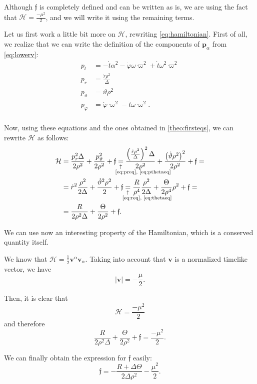 Although $\mathfrak{f}$ is completely defined and can be written as is, we are using the fact that $\mathcal{H} = \frac{-\mu^2}{2}$, and we will write it using the remaining terms.

Let us first work a little bit more on $\mathcal{H}$, rewriting \autoref{eq:hamiltonian}. First of all, we realize that we can write the definition of the components of $\mathbf{p}_\alpha$ from \autoref{eq:lowerv}:
\begin{align}
\label{eq:pteq}
p_t &= -\dot{t}\alpha^2 - \dot{\varphi}\omega\varpi^2 + \dot{t}\omega^2\varpi^2 \\
\label{eq:preq}
p_r &= \frac{\dot{r}\rho^2}{\Delta}\\
\label{eq:pthetaeq}
p_\vartheta &= \dot{\vartheta}\rho^2\\
\label{eq:pphieq}
p_\varphi &= \dot{\varphi}\varpi^2 - \dot{t}\omega\varpi^2.\\
\end{align}

Now, using these equations and the ones obtained in \autoref{theo:firsteqs}, we can rewrite $\mathcal{H}$ as follows:
\begin{align*}
\mathcal{H} &= \frac{p_r^2 \Delta}{2\rho^2} + \frac{p_\vartheta^2}{2\rho^2} + \mathfrak{f} \eqnote{=}{\ref{eq:preq}, \ref{eq:pthetaeq}} \frac{\left( \frac{\dot{r}\rho^2}{\Delta} \right)^2 \Delta}{2\rho^2} + \frac{\left(\dot{\vartheta}\rho^2\right)^2}{2\rho^2} + \mathfrak{f} = \\
&= \dot{r}^2\frac{\rho^2}{2\Delta} + \frac{\dot{\vartheta}^2\rho^2}{2} + \mathfrak{f} \eqnote{=}{\ref{eq:req}, \ref{eq:thetaeq}} \frac{R}{\rho^4 }\frac{\rho^2}{2\Delta} + \frac{\Theta}{2\rho^4}\rho^2 + \mathfrak{f} =\\
&= \frac{R}{2\rho^2\Delta} + \frac{\Theta}{2\rho^2} + \mathfrak{f}.
\end{align*}

We can use now an interesting property of the Hamiltonian, which is a conserved quantity itself.

We know that $\mathcal{H} = \frac{1}{2} \mathbf{v}^\alpha \mathbf{v}_\alpha$. Taking into account that $\mathbf{v}$ is a normalized timelike vector, we have
\[
\vert \mathbf{v} \vert = - \frac{\mu}{2}.
\]

Then, it is clear that
\[
\mathcal{H} = \frac{-\mu^2}{2}
\]
and therefore
\[
\frac{R}{2\rho^2\Delta} + \frac{\Theta}{2\rho^2} + \mathfrak{f} = \frac{-\mu^2}{2}.
\]

We can finally obtain the expression for $\mathfrak{f}$ easily:
\[
\mathfrak{f} = - \frac{R + \Delta \Theta}{2\Delta\rho^2} - \frac{\mu^2}{2}.
\]

